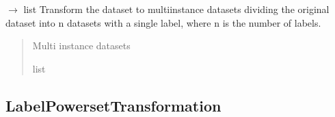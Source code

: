 \documentclass[letterpaper,10pt,english]{sphinxmanual}
\begin{document}
\begin{fulllineitems}
\begin{fulllineitems}
\end{fulllineitems}


\begin{fulllineitems}
\label{\detokenize{transformation/mimlTOmi/_autosummary/miml.transformation.mimlTOmi.binary_relevance_transformation.BinaryRelevanceTransformation:miml.transformation.mimlTOmi.binary_relevance_transformation.BinaryRelevanceTransformation.transform_dataset}}
\pysigstartsignatures
\pysiglinewithargsret
{}
{}
{{ $\rightarrow$ list}}
\pysigstopsignatures
\sphinxAtStartPar
Transform the dataset to multi\sphinxhyphen{}instance datasets dividing the original dataset into n datasets with a single
label, where n is the number of labels.
\begin{quote}\begin{description}
\sphinxAtStartPar
{} \textendash{} Multi instance datasets

\sphinxAtStartPar
list

\end{description}\end{quote}

\end{fulllineitems}


\end{fulllineitems}


\sphinxstepscope


\subsection{LabelPowersetTransformation}
\label{\detokenize{transformation/mimlTOmi/label_powerset_transformation:labelpowersettransformation}}\label{\detokenize{transformation/mimlTOmi/label_powerset_transformation::doc}}
\end{document}
